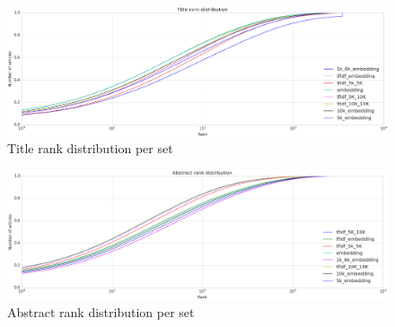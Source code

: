 \documentclass[../../Thesis.tex]{subfiles}
\begin{document}
\begin{figure}[hbt]
\includegraphics[width=6.5in]{Plots/Title_rank_distribution}
\caption{Title rank distribution per set}\label{figure:titleDistribution}
\end{figure}
\begin{figure}[hbt]
\includegraphics[width=6.5in]{Plots/Abstract_rank_distribution}
\caption{Abstract rank distribution per set}\label{figure:abstractDistribution}
\end{figure}
\end{document}
